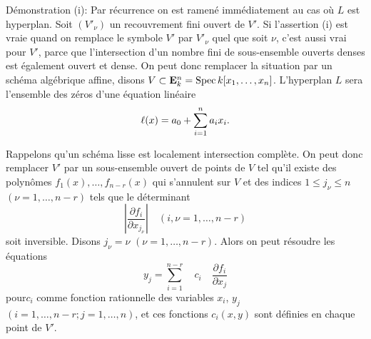 \documentclass[10pt]{../fichiers-configuration-latex/smfart}
\begin{document}
Démonstration (i): Par récurrence on est ramené immédiatement au cas
où $L$ est hyperplan. Soit $(V'_{\nu})$ un recouvrement fini ouvert de
$V'$. Si l'assertion (i) est vraie quand on remplace le symbole $V'$
par $V'_{\nu}$ quel que soit $\nu$, c'est aussi vrai pour $V'$, parce
que l'intersection d'un nombre fini de sous-ensemble ouverts denses
est également ouvert et dense. On peut donc remplacer la situation par
un schéma algébrique affine, disons $V\subset \mathbf{E}^n_k=\operatorname{Spec}
k[x_1,\dots,x_n]$. L'hyperplan $L$ sera l'ensemble des zéros d'une
équation linéaire
$$
\ell(x)=a_0+\sum^n_{i=1}a_ix_i{}.
$$

Rappelons qu'un schéma lisse est localement intersection complète. On
peut donc remplacer $V'$ par un sous-ensemble ouvert de points de $V$
tel qu'il existe des polynômes $f_1(x),\ldots,f_{n-r}(x)$ qui
s'annulent sur $V$ et des indices $1\leq j_{\nu}\leq n$
$(\nu=1,\ldots,n-r)$ tels que le déterminant
$$
\left|\frac{\partial f_i}{\partial x_{j_{\nu}}}\right|\quad 
(i,\nu=1,\ldots,n-r)
$$
soit inversible. Disons $j_{\nu}=\nu$ $(\nu=1,\ldots,n-r)$. Alors on peut
résoudre les équations
$$
y_j=\sum^{n-r}_{i=1}\quad c_i\quad \frac{\partial f_i}{\partial x_j}
$$
pour\pageoriginale $c_i$ comme fonction rationnelle des variables $x_i$, $y_j$
$(i=1,\ldots, n-r; j=1,\ldots,n)$, et ces fonctions $c_i(x,y)$ sont
définies en chaque point de $V'$.
\end{document}
